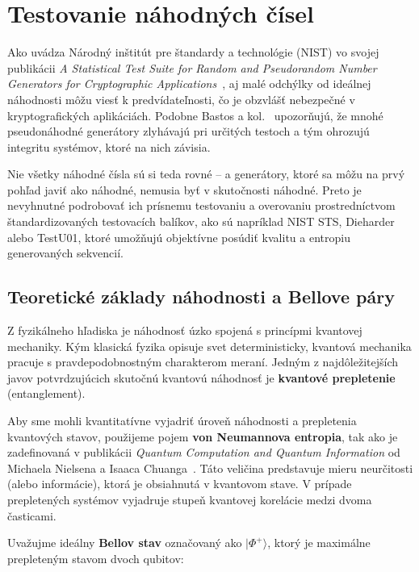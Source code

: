 \chapter{Testovanie náhodných čísel}\label{ch:testovanie-nahodnych-cisel}

Ako uvádza Národný inštitút pre štandardy a technológie (NIST) vo svojej publikácii \textit{A Statistical Test Suite for Random and Pseudorandom Number Generators for Cryptographic Applications}~\cite{NIST_SP800-22}, aj malé odchýlky od ideálnej náhodnosti môžu viesť k predvídateľnosti, čo je obzvlášť nebezpečné v kryptografických aplikáciách. Podobne Bastos a kol.~\cite{Bastos2020_ON_PRNG} upozorňujú, že mnohé pseudonáhodné generátory zlyhávajú pri určitých testoch a tým ohrozujú integritu systémov, ktoré na nich závisia.

Nie všetky náhodné čísla sú si teda rovné – a generátory, ktoré sa môžu na prvý pohľad javiť ako náhodné, nemusia byť v skutočnosti náhodné. Preto je nevyhnutné podrobovať ich prísnemu testovaniu a overovaniu prostredníctvom štandardizovaných testovacích balíkov, ako sú napríklad NIST STS, Dieharder alebo TestU01, ktoré umožňujú objektívne posúdiť kvalitu a entropiu generovaných sekvencií.

\section{Teoretické základy náhodnosti a Bellove páry}\label{sec:teoreticke-zaklady-nahodnosti-a-bellove-pary}

Z fyzikálneho hľadiska je náhodnosť úzko spojená s princípmi kvantovej mechaniky. Kým klasická fyzika opisuje svet deterministicky, kvantová mechanika pracuje s pravdepodobnostným charakterom meraní. Jedným z najdôležitejších javov potvrdzujúcich skutočnú kvantovú náhodnosť je \textbf{kvantové prepletenie} (entanglement).

Aby sme mohli kvantitatívne vyjadriť úroveň náhodnosti a prepletenia kvantových stavov, použijeme pojem \textbf{von Neumannova entropia}, tak ako je zadefinovaná v publikácii \textit{Quantum Computation and Quantum Information} od Michaela Nielsena a Isaaca Chuanga~\cite{nielsen_chuang_2010}. Táto veličina predstavuje mieru neurčitosti (alebo informácie), ktorá je obsiahnutá v kvantovom stave. V prípade prepletených systémov vyjadruje stupeň kvantovej korelácie medzi dvoma časticami.

Uvažujme ideálny \textbf{Bellov stav} označovaný ako $\lvert \Phi^+ \rangle$, ktorý je maximálne prepleteným stavom dvoch qubitov:


